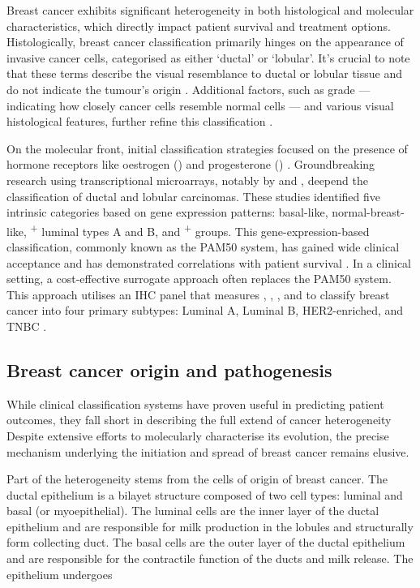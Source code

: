 Breast cancer exhibits significant heterogeneity in both histological and molecular characteristics, which directly impact patient survival and treatment options. Histologically, breast cancer classification primarily hinges on the appearance of invasive cancer cells, categorised as either `ductal' or  `lobular'. It's crucial to note that these terms describe the visual resemblance to ductal or lobular tissue and do not indicate the tumour's origin  \parencite{Tabar2022-iq}. Additional factors, such as grade — indicating how closely cancer cells resemble normal cells — and various visual histological features, further refine this classification \parencite{Elston1991-md}.

On the molecular front, initial classification strategies focused on the presence of hormone receptors like oestrogen () and progesterone () \parencite{Early_breast_cancer_trialists_collaborative_group1992-dy}. Groundbreaking research using transcriptional microarrays, notably by \textcite{Perou2000-hc} and \textcite{Sorlie2001-yy}, deepend the classification of ductal and lobular carcinomas. These studies identified five intrinsic categories based on gene expression patterns: basal-like, normal-breast-like, \textsuperscript{+} luminal types A and B, and \textsuperscript{+} groups. This gene-expression-based classification, commonly known as the PAM50 system, has gained wide clinical acceptance and has demonstrated correlations with patient survival \parencite{Wallden2015-bp}. In a clinical setting, a cost-effective surrogate approach often replaces the PAM50 system. This approach utilises an \ac{IHC} panel that measures , , , and  to classify breast cancer into four primary subtypes: Luminal A, Luminal B, HER2-enriched, and \ac{TNBC} \parencite{Goldhirsch2013-xy}.

\subsection*{Breast cancer origin and pathogenesis}

While clinical classification systems have proven useful in predicting patient outcomes, they fall short in describing the full extend of cancer heterogeneity Despite extensive efforts to molecularly characterise its evolution, the precise mechanism underlying the initiation and spread of breast cancer remains elusive. 

Part of the heterogeneity stems from the cells of origin of breast cancer. The ductal epithelium is a bilayet structure composed of two cell types: luminal and basal (or myoepithelial). The luminal cells are the inner layer of the ductal epithelium and are responsible for milk production in the lobules and structurally form collecting duct. The basal cells are the outer layer of the ductal epithelium and are responsible for the contractile function of the ducts and milk release. The epithelium undergoes   


